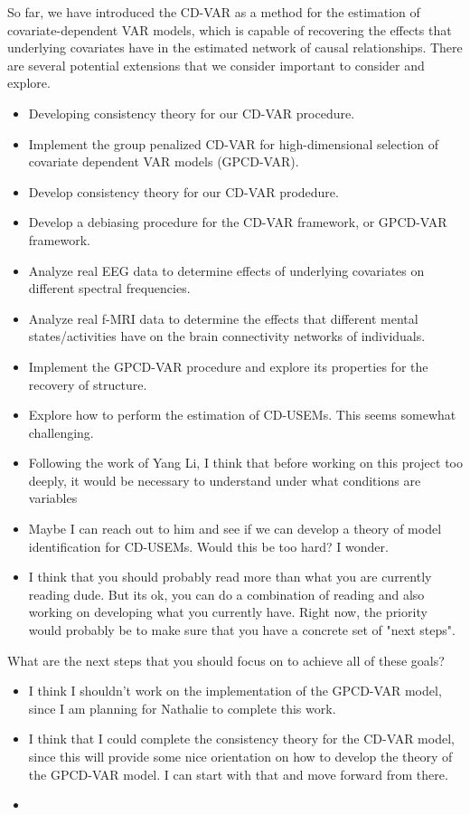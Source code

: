 So far, we have introduced the CD-VAR as a method for the estimation of covariate-dependent VAR models, which is capable of recovering the effects that underlying covariates have in the estimated network of causal relationships. There are several potential extensions that we consider important to consider and explore. 

\begin{itemize}
	\item Developing consistency theory for our CD-VAR procedure.
	\item Implement the group penalized CD-VAR for high-dimensional selection of covariate dependent VAR models (GPCD-VAR).
	\item Develop consistency theory for our CD-VAR prodedure.
	\item Develop a debiasing procedure for the CD-VAR framework, or GPCD-VAR framework.
	\item Analyze real EEG data to determine effects of underlying covariates on different spectral frequencies.
	\item Analyze real f-MRI data to determine the effects that different mental states/activities have on the brain connectivity networks of individuals.
	\item Implement the GPCD-VAR procedure and explore its properties for the recovery of structure.
	\item Explore how to perform the estimation of CD-USEMs. This seems somewhat challenging.
	\item Following the work of Yang Li, I think that before working on this project too deeply, it would be necessary to understand under what conditions are variables 
	\item Maybe I can reach out to him and see if we can develop a theory of model identification for CD-USEMs. Would this be too hard? I wonder. 
	\item I think that you should probably read more than what you are currently reading dude.  But its ok, you can do a combination of reading and also working on developing what you currently have. Right now, the priority would probably be to make sure that you have a concrete set of "next steps".
\end{itemize}


What are the next steps that you should focus on to achieve all of these goals?

\begin{itemize}
	\item I think I shouldn't work on the implementation of the GPCD-VAR model, since I am planning for Nathalie to complete this work.
	\item I think that I could complete the consistency theory for the CD-VAR model, since this will provide some nice orientation on how to develop the theory of the GPCD-VAR model. I can start with that and move forward from there.
	\item 
\end{itemize}


